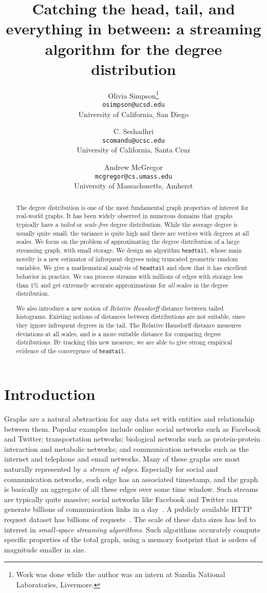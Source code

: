 \documentclass[11pt]{article}
\author{Olivia Simpson\thanks{Work was done while the author
was an intern at Sandia National Laboratories, Livermore.}
\\ {\tt osimpson@ucsd.edu}\\
University of California, San Diego
\and C. Seshadhri
 \\ {\tt scomandu@ucsc.edu}\\
University of California, Santa Cruz
\and Andrew McGregor
\\ {\tt mcgregor@cs.umass.edu}\\
University of Massachusetts, Amherst
}
\title{Catching the head, tail, and everything in between: a streaming algorithm for the degree distribution}
\date{}
\theoremstyle{definition}
\newcommand{\degdist}{{\tt headtail}}
\begin{document}
\maketitle

\begin{abstract}
The degree distribution is one of the most fundamental graph properties of interest
for real-world graphs. It has been widely observed in numerous domains that graphs
typically have a \emph{tailed} or \emph{scale-free} degree distribution. While the average
degree is usually quite small, the variance is quite high and there are vertices
with degrees at all scales. We focus on the problem of approximating the degree distribution
of a large streaming graph, with small storage. We design an algorithm \degdist{}, whose main novelty
is a new estimator of infrequent degrees using truncated geometric random
variables. We give a mathematical analysis of \degdist{}
and show that it has excellent behavior in practice. We can process streams with millions
of edges with storage less than $1\%$ and get extremely accurate approximations
for \emph{all} scales in the degree distribution.

We also introduce a new notion of \emph{Relative Hausdorff} distance between tailed
histograms. Existing notions of distances between distributions are not suitable, since they ignore
infrequent degrees in the tail. The Relative Hausdorff distance measures deviations at all scales,
and is a more suitable distance for comparing degree distributions. By tracking this new measure,
we are able to give strong empirical evidence of the convergence of \degdist.
\end{abstract}

\section{Introduction}

Graphs are a natural abstraction for any data set with entities and relationship between them. Popular examples include online social networks such as Facebook and Twitter;  transportation networks; biological networks such as protein-protein interaction and metabolic networks; and communication networks such as the internet and telephone and email networks.
Many of these graphs are most naturally represented by
a \emph{stream of edges}. Especially for social and communication networks, each edge has an associated timestamp, and the graph
is basically an aggregate of all these edges over some time window.
Such streams are typically quite massive; social networks like Facebook and Twitter can generate billions of communication links in a day~\cite{KwLe10,FB}.
A publicly available HTTP request dataset has billions of requests~\cite{Meiss08WSDM}. The scale of these data sizes has led
to interest in \emph{small-space streaming algorithms}. Such algorithms accurately compute specific properties
of the total graph, using a memory footprint that is orders of magnitude smaller in size.
\end{document}
